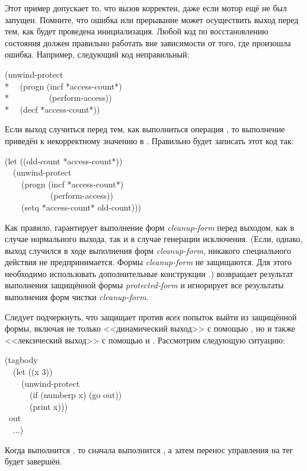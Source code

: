 \begin{defspec}
Этот пример допускает то, что вызов  корректен, даже если
мотор ещё не был запущен. Помните, что ошибка или прерывание может осуществить
выход перед тем, как будет проведена инициализация. Любой код по восстановлению
состояния должен правильно работать вне зависимости от того, где произошла
ошибка.
Например, следующий код неправильный:
\begin{lisp}
(unwind-protect \\*
~~(progn (incf *access-count*) \\*
~~~~~~~~~(perform-access)) \\*
~~(decf *access-count*))
\end{lisp}
Если выход случиться перед тем, как выполниться операция , то
выполнение  приведён к некорректному значению в .
Правильно будет записать этот код так:
\begin{lisp}
(let ((old-count *access-count*)) \\
~~(unwind-protect \\
~~~~(progn (incf *access-count*) \\
~~~~~~~~~~~(perform-access)) \\
~~~~(setq *access-count* old-count)))
\end{lisp}

Как правило,  гарантирует выполнение форм
\emph{cleanup-form} перед выходом, как в случае нормального выхода, так и в
случае генерации исключения.
(Если, однако, выход случился в ходе выполнения форм \emph{cleanup-form},
никакого специального действия не предпринимается. Формы \emph{cleanup-form} не
защищаются. Для этого необходимо использовать дополнительные
конструкции .)
 возвращает результат выполнения защищённой формы
\emph{protected-form} и игнорирует все результаты выполнения форм чистки
\emph{cleanup-form}.

Следует подчеркнуть, что  защищает против \emph{всех}
попыток выйти из защищённой формы, включая не только <<динамический выход>> с
помощью , но и также <<лексический выход>> с помощью  и
. Рассмотрим следующую ситуацию:
\begin{lisp}
(tagbody \\
~~(let ((x 3)) \\
~~~~(unwind-protect \\
~~~~~~(if (numberp x) (go out)) \\
~~~~~~(print x))) \\
~out \\
~~...)
\end{lisp}
Когда выполнится , то сначала выполнится , а затем перенос управления
на тег  будет завершён.
\end{defspec}

